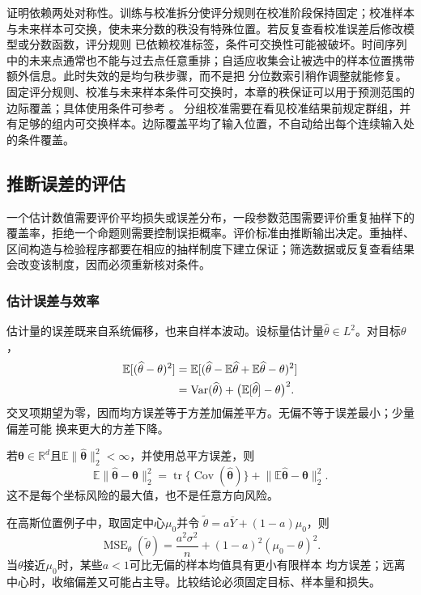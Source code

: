 证明依赖两处对称性。训练与校准拆分使评分规则在校准阶段保持固定；校准样本与未来样本可交换，使未来分数的秩没有特殊位置。若反复查看校准误差后修改模型或分数函数，评分规则
已依赖校准标签，条件可交换性可能被破坏。时间序列中的未来点通常也不能与过去点任意重排；自适应收集会让被选中的样本位置携带额外信息。此时失效的是均匀秩步骤，而不是把
分位数索引稍作调整就能修复。固定评分规则、校准与未来样本条件可交换时，本章的秩保证可以用于预测范围的边际覆盖；具体使用条件可参考
。
分组校准需要在看见校准结果前规定群组，并有足够的组内可交换样本。边际覆盖平均了输入位置，不自动给出每个连续输入处的条件覆盖。

\subsection{推断误差的评估}
\label{sec:stats-uncertainty-testing-selection}
一个估计数值需要评价平均损失或误差分布，一段参数范围需要评价重复抽样下的覆盖率，拒绝一个命题则需要控制误拒概率。评价标准由推断输出决定。重抽样、区间构造与检验程序都要在相应的抽样制度下建立保证；筛选数据或反复查看结果会改变该制度，因而必须重新核对条件。

\subsubsection{估计误差与效率}
\label{sec:statistics-bias-efficiency}
估计量的误差既来自系统偏移，也来自样本波动。设标量估计量\(\widehat\theta\in L^2\)。对目标\(\theta\)，
\begin{align}
  \mathbb{E}[(\widehat\theta-\theta)^2]
  &=
  \mathbb{E}[(\widehat\theta-\mathbb{E}\widehat\theta
  +\mathbb{E}\widehat\theta-\theta)^2] \notag\\
  &=
  \operatorname{Var}(\widehat\theta)
  +\bigl(\mathbb{E}[\widehat\theta]-\theta\bigr)^2.
  \label{eq:statistics-mse-decomposition}
\end{align}
交叉项期望为零，因而均方误差等于方差加偏差平方。无偏不等于误差最小；少量偏差可能
换来更大的方差下降。

若\(\bm\theta\in\mathbb{R}^d\)且\(\mathbb E\lVert\widehat{\bm\theta}\rVert_2^2<\infty\)，并使用总平方误差，则
\[
  \mathbb{E}\lVert\widehat{\bm\theta}-\bm\theta\rVert_2^2
  =\operatorname{tr}\{\operatorname{Cov}(\widehat{\bm\theta})\}
   +\lVert\mathbb{E}\widehat{\bm\theta}-\bm\theta\rVert_2^2.
\]
这不是每个坐标风险的最大值，也不是任意方向风险。

在高斯位置例子中，取固定中心\(\mu_0\)并令
\(\widetilde\theta=a\overline Y+(1-a)\mu_0\)，则
\[
  \operatorname{MSE}_\theta(\widetilde\theta)
  =\frac{a^2\sigma^2}{n}+(1-a)^2(\mu_0-\theta)^2.
\]
当\(\theta\)接近\(\mu_0\)时，某些\(a<1\)可比无偏的样本均值具有更小有限样本
均方误差；远离中心时，收缩偏差又可能占主导。比较结论必须固定目标、样本量和损失。

